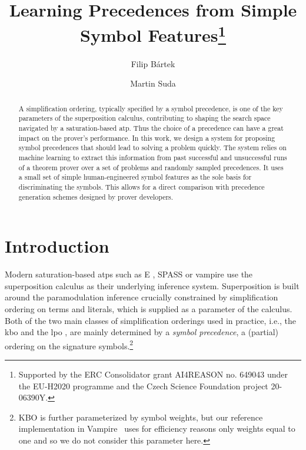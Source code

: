 \documentclass[a4paper]{easychair}
\title{Learning Precedences from Simple Symbol Features\thanks{Supported by the ERC Consolidator grant AI4REASON no. 649043 under the EU-H2020 programme and the Czech Science Foundation project 20-06390Y.}}
\author{Filip B\'{a}rtek \and Martin Suda}
\institute{Czech Technical University in Prague, Czech Republic}
\begin{document}
\maketitle

\begin{abstract}
A simplification ordering, typically specified by a symbol precedence,
is one of the key parameters of the superposition calculus, contributing
to shaping the search space navigated by a saturation-based \acrlong*{atp}.
Thus the choice of a precedence can have a great impact on the prover's performance.
In this work, we design a system for proposing symbol precedences
that should lead to solving a problem quickly.
The system relies on machine learning to extract this information from
past successful and unsuccessful runs of a theorem prover over a set of problems and randomly sampled precedences.
It uses a small set of simple human-engineered symbol features as the sole
basis for discriminating the symbols. This allows for a direct comparison
with precedence generation schemes designed by prover developers.
\end{abstract}

\section{Introduction}

Modern saturation-based \glspl*{atp} such as E \cite{SCV:CADE-2019}, SPASS \cite{DBLP:conf/cade/WeidenbachDFKSW09} 
or \gls*{vampire} \cite{Kovacs2013}
use the superposition calculus \cite{DBLP:books/el/RV01/NieuwenhuisR01} as their underlying inference system.
Superposition is built around the paramodulation inference \cite{Robinson1983} crucially
constrained by simplification ordering on terms and literals, which is supplied as a parameter of the calculus.
Both of the two main classes of simplification orderings used in practice,
i.e., the \acrlong*{kbo} \cite{Knuth1983}
and the \acrlong*{lpo} \cite{Kamin1980},
are mainly determined by a %
\emph{symbol precedence}, a (partial) ordering on the signature symbols.\footnote{KBO is further parameterized by symbol weights, but our reference implementation in Vampire~\cite{Kovacs2013} 
uses for efficiency reasons only weights equal to one \cite{DBLP:conf/cade/KovacsMV11} and so we do not consider this parameter here.}
\end{document}
